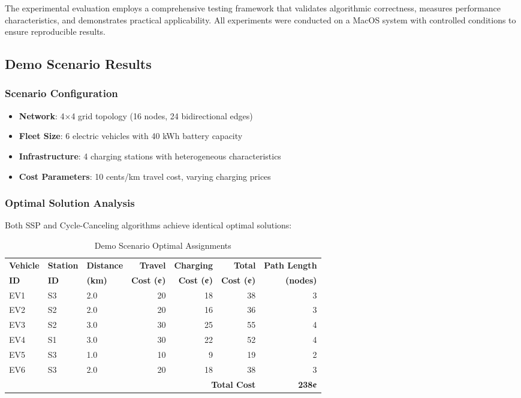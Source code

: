 \documentclass[12pt,a4paper]{article}
\begin{document}
The experimental evaluation employs a comprehensive testing framework that validates algorithmic correctness, measures performance characteristics, and demonstrates practical applicability. All experiments were conducted on a MacOS system with controlled conditions to ensure reproducible results.

\subsection{Demo Scenario Results}

\subsubsection{Scenario Configuration}
\begin{itemize}
\item \textbf{Network}: 4×4 grid topology (16 nodes, 24 bidirectional edges)
\item \textbf{Fleet Size}: 6 electric vehicles with 40 kWh battery capacity
\item \textbf{Infrastructure}: 4 charging stations with heterogeneous characteristics
\item \textbf{Cost Parameters}: 10 cents/km travel cost, varying charging prices
\end{itemize}

\subsubsection{Optimal Solution Analysis}

Both SSP and Cycle-Canceling algorithms achieve identical optimal solutions:

\begin{table}[H]
\centering
\caption{Demo Scenario Optimal Assignments}
\label{tab:demo_assignments}
\begin{tabular}{@{}lllrrrr@{}}
\toprule
\textbf{Vehicle} & \textbf{Station} & \textbf{Distance} & \textbf{Travel} & \textbf{Charging} & \textbf{Total} & \textbf{Path Length} \\
\textbf{ID} & \textbf{ID} & \textbf{(km)} & \textbf{Cost (¢)} & \textbf{Cost (¢)} & \textbf{Cost (¢)} & \textbf{(nodes)} \\
\midrule
EV1 & S3 & 2.0 & 20 & 18 & 38 & 3 \\
EV2 & S2 & 2.0 & 20 & 16 & 36 & 3 \\
EV3 & S2 & 3.0 & 30 & 25 & 55 & 4 \\
EV4 & S1 & 3.0 & 30 & 22 & 52 & 4 \\
EV5 & S3 & 1.0 & 10 & 9 & 19 & 2 \\
EV6 & S3 & 2.0 & 20 & 18 & 38 & 3 \\
\midrule
\multicolumn{6}{r}{\textbf{Total Cost}} & \textbf{238¢} \\
\bottomrule
\end{tabular}
\end{table}
\end{document}
